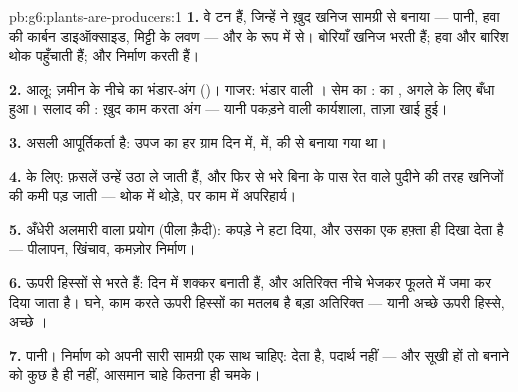 \begin{solution}{pb:g6:plants-are-producers:1}
\textbf{1.} वे टन  हैं, जिन्हें  ने ख़ुद खनिज
सामग्री से बनाया --- पानी, हवा की कार्बन डाइऑक्साइड, मिट्टी के लवण ---
और  के रूप में  से। बोरियाँ खनिज भरती हैं; हवा और बारिश थोक
पहुँचाती हैं; और  निर्माण करती हैं।

\textbf{2.} आलू: ज़मीन के नीचे का भंडार-अंग ()। गाजर: भंडार वाली
। सेम का :  का , अगले  के लिए बँधा हुआ। सलाद की
: ख़ुद काम करता अंग --- यानी  पकड़ने वाली कार्यशाला, ताज़ा
खाई हुई।

\textbf{3.} असली आपूर्तिकर्ता  है: उपज का हर ग्राम दिन में,
 में,  की  से बनाया गया था।

\textbf{4.}  के लिए: फ़सलें उन्हें उठा ले जाती हैं, और फिर से
भरे बिना  के पास रेत वाले पुदीने की तरह खनिजों की कमी पड़ जाती ---
थोक में थोड़े, पर काम में अपरिहार्य।

\textbf{5.} अँधेरी अलमारी वाला प्रयोग (पीला क़ैदी): कपड़े ने  हटा
दिया, और उसका एक हफ़्ता ही दिखा देता है --- पीलापन, खिंचाव, कमज़ोर
निर्माण।

\textbf{6.}  ऊपरी हिस्सों से भरते हैं:  दिन में शक्कर बनाती
हैं, और अतिरिक्त नीचे भेजकर फूलते  में जमा कर दिया जाता है। घने,
काम करते ऊपरी हिस्सों का मतलब है बड़ा अतिरिक्त --- यानी अच्छे ऊपरी
हिस्से, अच्छे ।

\textbf{7.} पानी। निर्माण को अपनी सारी सामग्री एक साथ चाहिए: 
 देता है, पदार्थ नहीं --- और  सूखी हों तो बनाने को कुछ है ही
नहीं, आसमान चाहे कितना ही चमके।


\end{solution}
